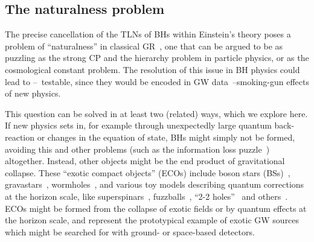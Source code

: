 \documentclass[aps,twocolumn,showpacs,preprintnumbers,nofootinbib,prd,superscriptaddress,groupedaddress,10pt]{revtex4-1}
\begin{document}
\subsection{The naturalness problem}
The precise cancellation of the TLNs of BHs within Einstein's theory poses a problem of ``naturalness'' in classical GR~\cite{Porto:2016pyg,Porto:2016zng,Rothstein:simons}, one that can be argued to be as puzzling as the strong CP and the hierarchy problem in particle physics, or as the cosmological constant problem. The resolution of this issue in BH physics could lead to --~testable, since they would be encoded in GW data~--smoking-gun effects of new physics. 

This question can be solved in at least two (related) ways, which we explore here. If new physics sets in, for example through unexpectedly large quantum back-reaction or changes in the equation of state, BHs might simply not be formed, 
avoiding this and other problems (such as the information loss puzzle~\cite{Mathur:2009hf}) altogether.
Instead, other objects might be the end product of gravitational collapse.
These ``exotic compact objects'' (ECOs) include boson stars (BSs)~\cite{Schunck:2003kk,Liebling:2012fv,Brito:2015pxa,Brito:2015yfh,Grandclement:2016eng}, gravastars~\cite{Mazur:2001fv,Visser:2003ge}, wormholes~\cite{visser1995lorentzian}, 
and various toy models describing quantum corrections at the horizon scale, like superspinars~\cite{Gimon:2007ur}, fuzzballs~\cite{Skenderis:2008qn}, ``2-2 holes''~\cite{Holdom:2016nek} and others~\cite{Saravani:2012is,Giddings:2014ova,Abedi:2016hgu}.
ECOs might be formed from the collapse of exotic fields or by quantum effects at the horizon scale, and represent the prototypical example of exotic GW sources~\cite{Pani:2009ss,Macedo:2013jja,Giudice:2016zpa} which might be searched for with ground- or space-based detectors.
\end{document}
